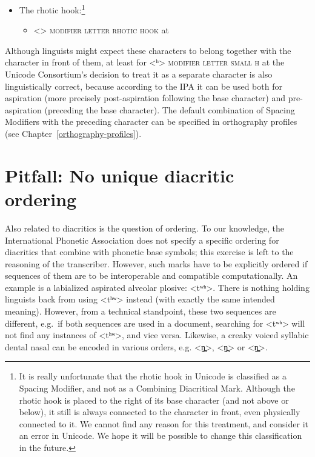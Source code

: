 \begin{itemize}
	\item[] The rhotic hook:\footnote{It is really unfortunate that the rhotic hook
         in Unicode is classified as a Spacing Modifier, and not as a Combining 
         Diacritical Mark. Although the rhotic hook is placed to the right of its 
         base character (and not above or below), it still is always connected 
         to the character in front, even physically connected to it. We cannot 
         find any reason for this treatment, and consider it an error in 
         Unicode. We hope it will be possible to change this classification in 
         the future.}
	\begin{itemize}
	  \item[] <> \textsc{modifier letter rhotic hook} at 
	\end{itemize}
	
\end{itemize}

Although linguists might expect these characters to belong together with the
character in front of them, at least for <ʰ> \textsc{modifier letter small h} at
 the Unicode Consortium's decision to treat it as a separate character
is also linguistically correct, because according to the IPA it can be used both
for aspiration (more precisely post-aspiration following the base character) and
pre-aspiration (preceding the base character). The default combination of Spacing Modifiers with
the preceding character can be specified in orthography profiles (see
Chapter~\ref{orthography-profiles}).

\section{Pitfall: No unique diacritic ordering}
\label{pitfall-no-unique-diacritic-ordering}

Also related to diacritics is the question of ordering. To our knowledge, the
International Phonetic Association does not specify a specific ordering for
diacritics that combine with phonetic base symbols; this exercise is left to the
reasoning of the transcriber. However, such marks have to be explicitly ordered
if sequences of them are to be interoperable and compatible computationally. An example is a
labialized aspirated alveolar plosive: <tʷʰ>. There is nothing holding linguists
back from using <tʰʷ> instead (with exactly the same intended meaning). However,
from a technical standpoint, these two sequences are different, e.g.~if both
sequences are used in a document, searching for <tʷʰ> will not find any
instances of <tʰʷ>, and vice versa. Likewise, a creaky voiced syllabic dental
nasal can be encoded in various orders, e.g. <n̪̰̩>, <n̩̰̪> or <n̩̪̰>.

